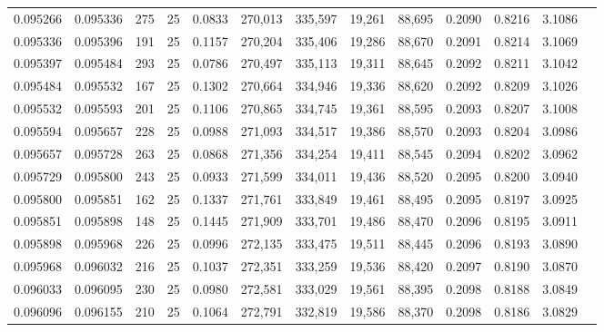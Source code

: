 \begin{tabular}{rrrrrrrrrrrrr}
0.095266 & 0.095336 &   275 &  25 &                                     0.0833 & 270,013 & 335,597 &  19,261 &  88,695 & 0.2090 & 0.8216 & 3.1086 \\
0.095336 & 0.095396 &   191 &  25 &                                     0.1157 & 270,204 & 335,406 &  19,286 &  88,670 & 0.2091 & 0.8214 & 3.1069 \\
0.095397 & 0.095484 &   293 &  25 &                                     0.0786 & 270,497 & 335,113 &  19,311 &  88,645 & 0.2092 & 0.8211 & 3.1042 \\
0.095484 & 0.095532 &   167 &  25 &                                     0.1302 & 270,664 & 334,946 &  19,336 &  88,620 & 0.2092 & 0.8209 & 3.1026 \\
0.095532 & 0.095593 &   201 &  25 &                                     0.1106 & 270,865 & 334,745 &  19,361 &  88,595 & 0.2093 & 0.8207 & 3.1008 \\
0.095594 & 0.095657 &   228 &  25 &                                     0.0988 & 271,093 & 334,517 &  19,386 &  88,570 & 0.2093 & 0.8204 & 3.0986 \\
0.095657 & 0.095728 &   263 &  25 &                                     0.0868 & 271,356 & 334,254 &  19,411 &  88,545 & 0.2094 & 0.8202 & 3.0962 \\
0.095729 & 0.095800 &   243 &  25 &                                     0.0933 & 271,599 & 334,011 &  19,436 &  88,520 & 0.2095 & 0.8200 & 3.0940 \\
0.095800 & 0.095851 &   162 &  25 &                                     0.1337 & 271,761 & 333,849 &  19,461 &  88,495 & 0.2095 & 0.8197 & 3.0925 \\
0.095851 & 0.095898 &   148 &  25 &                                     0.1445 & 271,909 & 333,701 &  19,486 &  88,470 & 0.2096 & 0.8195 & 3.0911 \\
0.095898 & 0.095968 &   226 &  25 &                                     0.0996 & 272,135 & 333,475 &  19,511 &  88,445 & 0.2096 & 0.8193 & 3.0890 \\
0.095968 & 0.096032 &   216 &  25 &                                     0.1037 & 272,351 & 333,259 &  19,536 &  88,420 & 0.2097 & 0.8190 & 3.0870 \\
0.096033 & 0.096095 &   230 &  25 &                                     0.0980 & 272,581 & 333,029 &  19,561 &  88,395 & 0.2098 & 0.8188 & 3.0849 \\
0.096096 & 0.096155 &   210 &  25 &                                     0.1064 & 272,791 & 332,819 &  19,586 &  88,370 & 0.2098 & 0.8186 & 3.0829 \\

\end{tabular}
